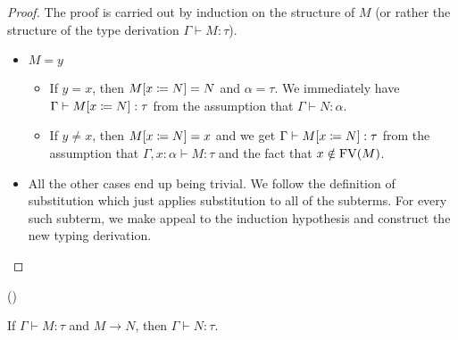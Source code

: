 \begin{proof}
  The proof is carried out by induction on the structure of $M$ (or rather
  the structure of the type derivation $\Gamma \vdash M : \tau$).

  \begin{itemize}
  \item $M = y$
    \begin{itemize}
    \item If $y = x$, then $M[x \coloneqq N] = N$ and $\alpha = \tau$. We
      immediately have $\Gamma \vdash M[x \coloneqq N] : \tau$ from the
      assumption that $\Gamma \vdash N : \alpha$.
    \item If $y \neq x$, then $M[x \coloneqq N] = x$ and we get
      $\Gamma \vdash M[x \coloneqq N] : \tau$ from the assumption that
      $\Gamma, x : \alpha \vdash M : \tau$ and the fact that
      $x \notin \operatorname{FV}(M)$.
    \end{itemize}
  
  \item All the other cases end up being trivial. We follow the definition
    of substitution which just applies substitution to all of the
    subterms. For every such subterm, we make appeal to the induction
    hypothesis and construct the new typing derivation.
  \end{itemize}
\end{proof}

\begin{property}\label{prop:subject-reduction}
  ()
  
  If $\Gamma \vdash M : \tau$ and $M \to N$, then $\Gamma \vdash N : \tau$.
\end{property}


